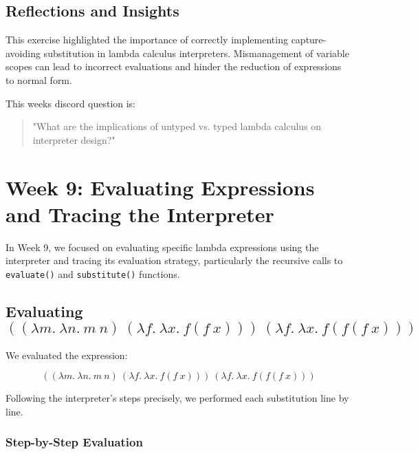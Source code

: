 \documentclass{article}
\begin{document}
\subsection*{Reflections and Insights}

This exercise highlighted the importance of correctly implementing capture-avoiding substitution in lambda calculus interpreters. Mismanagement of variable scopes can lead to incorrect evaluations and hinder the reduction of expressions to normal form.

This weeks discord question is:

\begin{quote}
\small
"What are the implications of untyped vs. typed lambda calculus on interpreter design?"
\end{quote}

\section{Week 9: Evaluating Expressions and Tracing the Interpreter}
\label{sec:week9}

In Week 9, we focused on evaluating specific lambda expressions using the interpreter and tracing its evaluation strategy, particularly the recursive calls to \texttt{evaluate()} and \texttt{substitute()} functions.


\subsection*{Evaluating \(\left((\lambda m.\ \lambda n.\ m\ n)\ (\lambda f.\ \lambda x.\ f(f\ x))\right)\ (\lambda f.\ \lambda x.\ f(f(f\ x)))\)}

We evaluated the expression:

\[
\left((\lambda m.\ \lambda n.\ m\ n)\ (\lambda f.\ \lambda x.\ f(f\ x))\right)\ (\lambda f.\ \lambda x.\ f(f(f\ x)))
\]

Following the interpreter's steps precisely, we performed each substitution line by line.

\subsubsection*{Step-by-Step Evaluation}
\end{document}
